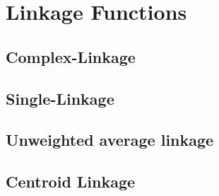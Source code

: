 \documentclass{article}
\begin{document}
\section*{Linkage Functions}
\subsection*{Complex-Linkage}
\subsection*{Single-Linkage}
\subsection*{Unweighted average linkage}
\subsection*{Centroid Linkage}
\end{document}
